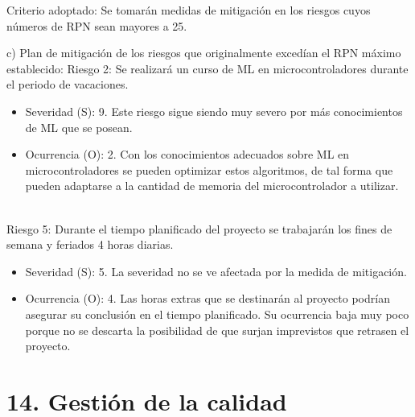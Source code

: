 \documentclass[
11pt, %
]{plan}
\begin{document}
Criterio adoptado:
Se tomarán medidas de mitigación en los riesgos cuyos números de RPN sean mayores a 25.

c) Plan de mitigación de los riesgos que originalmente excedían el RPN máximo establecido:
Riesgo 2: Se realizará un curso de ML en microcontroladores durante el periodo de vacaciones.
\begin{itemize}
	\item Severidad (S): 9. Este riesgo sigue siendo muy severo por más conocimientos de ML que se posean.
	\item Ocurrencia (O): 2. Con los conocimientos adecuados sobre ML en microcontroladores se pueden optimizar estos algoritmos, de tal forma que pueden adaptarse a la cantidad de memoria del microcontrolador a utilizar. \\ \\
\end{itemize}
Riesgo 5: Durante el tiempo planificado del proyecto se trabajarán los fines de semana y feriados 4 horas diarias.
\begin{itemize}
	\item Severidad (S): 5. La severidad no se ve afectada por la medida de mitigación.
	\item Ocurrencia (O): 4. Las horas extras que se destinarán al proyecto podrían asegurar su conclusión en el tiempo planificado. Su ocurrencia baja muy poco porque no se descarta la posibilidad de que surjan imprevistos que retrasen el proyecto.
\end{itemize}

\section{14. Gestión de la calidad}
\label{sec:calidad}
\end{document}
